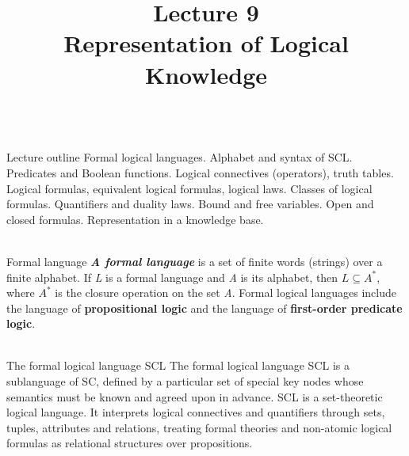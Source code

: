 \title{Lecture 9\\Representation of Logical Knowledge}

\begin{frame}
	\titlepage
\end{frame}

\begin{frame}{\\Lecture outline}
	\topline
	\justifying
	Formal logical languages. Alphabet and syntax of SCL. Predicates and Boolean functions. Logical connectives (operators), truth tables. Logical formulas, equivalent logical formulas, logical laws. Classes of logical formulas. Quantifiers and duality laws. Bound and free variables. Open and closed formulas. Representation in a knowledge base.
\end{frame}

\begin{frame}{\\Formal language}
	\topline
	\textbf{\textit{A formal language}} is a set of finite words (strings) over a finite alphabet.
	\bigskip
	If \textit{L} is a formal language and \textit{A} is its alphabet, then $L \subseteq A^*$, where $A^*$ is the closure operation on the set \textit{A}.
	\bigskip
	Formal logical languages include the language of \textbf{propositional logic} and the language of \textbf{first-order predicate logic}.
\end{frame}

\begin{frame}{\\The formal logical language SCL}
	\topline
	\justifying
	The formal logical language SCL is a sublanguage of SC, defined by a particular set of special key nodes whose semantics must be known and agreed upon in advance.
	\bigskip
	SCL is a set-theoretic logical language. It interprets logical connectives and quantifiers through sets, tuples, attributes and relations, treating formal theories and non-atomic logical formulas as relational structures over propositions.
\end{frame}

